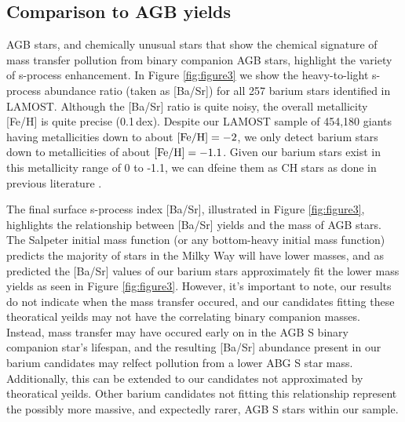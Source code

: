 \documentclass[a4paper,fleqn,usenatbib]{mnras}
\begin{document}
\subsection{Comparison to AGB yields}
AGB stars, and chemically unusual stars that show the chemical signature of mass transfer pollution from binary companion AGB stars, highlight the variety of s-process enhancement. In Figure \ref{fig:figure3} we show the heavy-to-light s-process abundance ratio (taken as [Ba/Sr]) for all 257 barium stars identified in LAMOST. Although the [Ba/Sr] ratio is quite noisy, the overall metallicity [Fe/H] is quite precise (0.1\,dex). Despite our LAMOST sample of 454,180 giants having metallicities down to about $[{\rm Fe/H}] = -2$, we only detect barium stars down to metallicities of about $[{\rm Fe/H}] = -1.1$. Given our barium stars exist in this metallicity range of 0 to -1.1, we can dfeine them as CH stars as done in previous literature \citep[e.g.][]{luck1991, mcclure1997}.

The final surface s-process index [Ba/Sr], illustrated in Figure \ref{fig:figure3}, highlights the relationship between [Ba/Sr] yields and the mass of AGB stars. The Salpeter initial mass function (or any bottom-heavy initial mass function) predicts the majority of stars in the Milky Way will have lower masses, and as predicted the [Ba/Sr] values of our barium stars approximately fit the lower mass yields as seen in Figure \ref{fig:figure3}. However, it's important to note, our results do not indicate when the mass transfer occured, and our candidates fitting these theoratical yeilds may not have the correlating binary companion masses. Instead, mass transfer may have occured early on in the AGB S binary companion star's lifespan, and the resulting [Ba/Sr] abundance present in our barium candidates may relfect pollution from a lower ABG S star mass. Additionally, this can be extended to our candidates not approximated by theoratical yeilds. Other barium candidates not fitting this relationship represent the possibly more massive, and expectedly rarer, AGB S stars within our sample.
\end{document}
